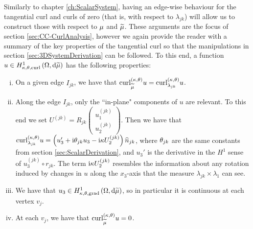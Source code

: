Similarly to chapter \ref{ch:ScalarSystem}, having an edge-wise behaviour for the tangential curl and curls of zero (that is, with respect to $\lambda_{jk}$) will allow us to construct those with respect to $\mu$ and $\widetilde{\mu}$.
These arguments are the focus of section \ref{sec:CC-CurlAnalysis}, however we again provide the reader with a summary of the key properties of the tangential curl so that the manipulations in section \ref{sec:3DSystemDerivation} can be followed.
To this end, a function $u\in H^1_{\kappa,\theta,\mathrm{curl}}\left( \Omega, \mathrm{d}\widetilde{\mu} \right)$ has the following properties:
\begin{enumerate}[(i)]
	\item On a given edge $I_{jk}$, we have that $\mathrm{curl}_{\widetilde{\mu}}^{\left( \kappa, \theta \right)}u = \mathrm{curl}_{\lambda_{jk}}^{\left( \kappa, \theta \right)}u$.
	\item Along the edge $I_{jk}$, only the ``in-plane" components of $u$ are relevant.
	To this end we set $U^{(jk)} = R_{jk}\begin{pmatrix} u^{(jk)}_1 \\ u^{(jk)}_2 \end{pmatrix}$.
	Then we have that $\mathrm{curl}_{\lambda_{jk}}^{\left( \kappa, \theta \right)}u = \left( u_3' + \mathrm{i}\theta_{jk}u_3 - \mathrm{i}\kappa U^{(jk)}_2 \right)\widehat{n}_{jk}$, where $\theta_{jk}$ are the same constants from section \ref{sec:ScalarDerivation}, and $u_3'$ is the derivative in the $H^1$ sense of $u^{(jk)}_3\circ r_{jk}$.
	The term $\mathrm{i}\kappa U^{(jk)}_2$ resembles the information about any rotation induced by changes in $u$ along the $x_3$-axis that the measure $\lambda_{jk}\times\lambda_1$ can see.
	\item We have that $u_3\in H^1_{\kappa,\theta,\mathrm{grad}}\left( \Omega, \mathrm{d}\widetilde{\mu} \right)$, so in particular it is continuous at each vertex $v_j$.
	\item At each $v_j$, we have that $\mathrm{curl}_{\widetilde{\mu}}^{\left( \kappa, \theta \right)}u = 0$.
\end{enumerate}